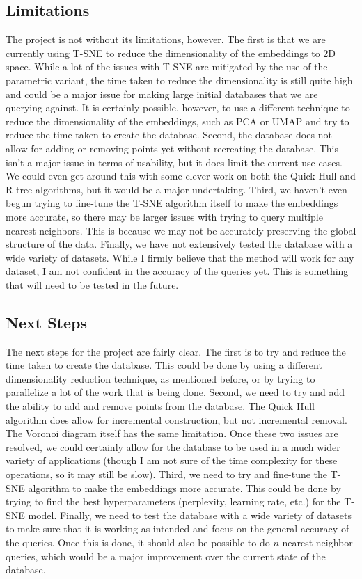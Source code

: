 \documentclass{article}
\begin{document}
\subsection{Limitations}
The project is not without its limitations, however. The first is that 
we are currently using T-SNE to reduce the dimensionality of the embeddings
to 2D space. While a lot of the issues with T-SNE are mitigated by the use
of the parametric variant, the time taken to reduce the dimensionality is
still quite high and could be a major issue for making large initial databases
that we are querying against. It is certainly possible, however, to use a different
technique to reduce the dimensionality of the embeddings, such as PCA or UMAP and 
try to reduce the time taken to create the database. Second, the database does not allow for adding 
or removing points yet without recreating the database. This isn't a major issue in terms of usability, but it does
limit the current use cases. We could even get around this with some clever work 
on both the Quick Hull and R tree algorithms, but it would be a major undertaking.
Third, we haven't even begun trying to fine-tune the T-SNE algorithm itself to
make the embeddings more accurate, so there may be larger issues with trying to 
query multiple nearest neighbors. This is because we may not be accurately preserving
the global structure of the data. Finally, we have not extensively tested the database
with a wide variety of datasets. While I firmly believe that the method will work for 
any dataset, I am not confident in the accuracy of the queries yet. This is something
that will need to be tested in the future.

\subsection{Next Steps}
The next steps for the project are fairly clear. The first is to try and reduce the
time taken to create the database. This could be done by using a different dimensionality
reduction technique, as mentioned before, or by trying to parallelize a lot of the work
that is being done. Second, we need to try and add the ability to add and remove points
from the database. The Quick Hull algorithm does allow for incremental construction, but
not incremental removal. The Voronoi diagram itself has the same limitation. Once these 
two issues are resolved, we could certainly allow for the database to be used in a much
wider variety of applications (though I am not sure of the time complexity for these operations,
so it may still be slow). Third, we need to try and fine-tune the T-SNE algorithm to make
the embeddings more accurate. This could be done by trying to find the best hyperparameters
(perplexity, learning rate, etc.) for the T-SNE model. Finally, we need to test the database
with a wide variety of datasets to make sure that it is working as intended and focus on
the general accuracy of the queries. Once this is done, it should also be possible to do 
$n$ nearest neighbor queries, which would be a major improvement over the current state of the database.
\end{document}
